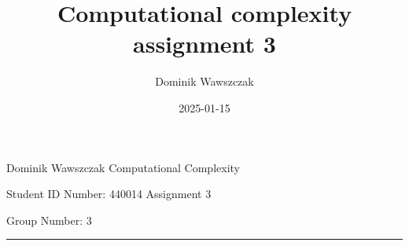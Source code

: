 \documentclass[12pt]{article}
\title{Computational complexity assignment 3}
\author{Dominik Wawszczak}
\date{2025-01-15}
\begin{document}
	\setlength{\parindent}{0 cm}
	
	Dominik Wawszczak \hfill Computational Complexity
	
	Student ID Number: 440014 \hfill Assignment 3
	
	Group Number: 3
	
	\bigskip
	\hrule
	\bigskip
	
	
\end{document}
